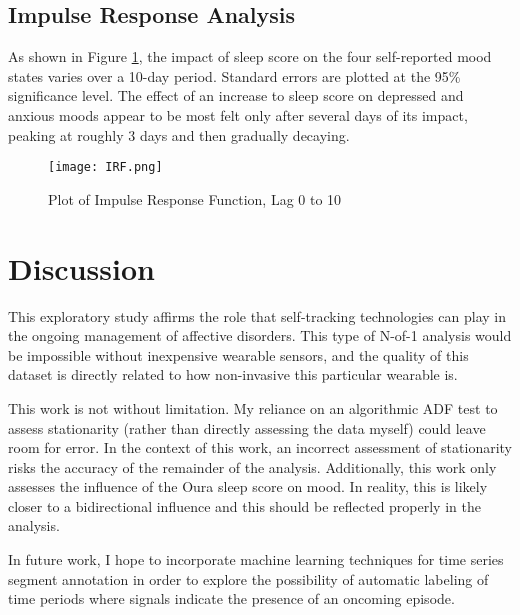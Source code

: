 \documentclass[9pt]{article}
\begin{document}
\subsection{Impulse Response Analysis}\label{impulse-response-analysis-1}

As shown in Figure \ref{IRF}, the impact of sleep score on the four
self-reported mood states varies over a 10-day period. Standard errors are
plotted at the 95\% significance level. The effect of an increase to sleep
score on depressed and anxious moods appear to be most felt only after several
days of its impact, peaking at roughly 3 days and then gradually decaying.

\begin{figure}[h] \centering
\texttt{[image: IRF.png]} \caption{Plot of Impulse
Response Function, Lag 0 to 10} \label{IRF} \end{figure}



\section{Discussion}\label{discussion}

This exploratory study affirms the role that self-tracking technologies can
play in the ongoing management of affective disorders. This type of N-of-1
analysis would be impossible without inexpensive wearable sensors, and the
quality of this dataset is directly related to how non-invasive this particular
wearable is.

This work is not without limitation. My reliance on an algorithmic ADF test to
assess stationarity (rather than directly assessing the data myself) could
leave room for error. In the context of this work, an incorrect assessment of
stationarity risks the accuracy of the remainder of the analysis. Additionally,
this work only assesses the influence of the Oura sleep score on mood. In
reality, this is likely closer to a bidirectional influence and this should be
reflected properly in the analysis.

In future work, I hope to incorporate machine learning techniques for time
series segment annotation in order to explore the possibility of automatic
labeling of time periods where signals indicate the presence of an oncoming
episode.

\pagebreak

\printbibliography
\end{document}
